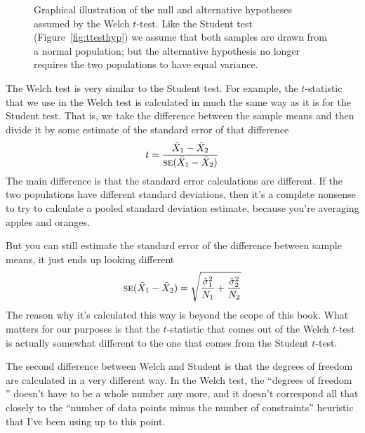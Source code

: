 \begin{figure}
\begin{center}
\caption{Graphical illustration of the null and alternative hypotheses assumed by the Welch $t$-test. Like the Student test (Figure~\ref{fig:ttesthyp}) we assume that both samples are drawn from a normal population; but the alternative hypothesis no longer requires the two populations to have equal variance.}
\HR
\label{fig:ttesthyp2}
\end{center}
\end{figure}

The Welch test is very similar to the Student test. For example, the $t$-statistic that we use in the Welch test is calculated in much the same way as it is for the Student test. That is, we take the difference between the sample means and then divide it by some estimate of the standard error of that difference
$$
t = \frac{\bar{X}_1 - \bar{X}_2}{\mbox{\textsc{se}}(\bar{X}_1 - \bar{X}_2)}
$$
The main difference is that the standard error calculations are different. If the two populations have different standard deviations, then it's a complete nonsense to try to calculate a pooled standard deviation estimate, because you're averaging apples and oranges. 

\vspace{0.5cm}
\begin{mdframed}[style=MyFrame,nobreak=true]
But you can still estimate the standard error of the difference between sample means, it just ends up looking different
$$
\mbox{\textsc{se}}(\bar{X}_1 - \bar{X}_2) = \sqrt{ \frac{{\hat{\sigma}_1}^2}{N_1} + \frac{{\hat{\sigma}_2}^2}{N_2} }
$$
The reason why it's calculated this way is beyond the scope of this book. What matters for our purposes is that the $t$-statistic that comes out of the Welch $t$-test is actually somewhat different to the one that comes from the Student $t$-test. 
\end{mdframed}

The second difference between Welch and Student is that the degrees of freedom are calculated in a very different way. In the Welch test, the ``degrees of freedom '' doesn't have to be a whole number any more, and it doesn't correspond all that closely to the ``number of data points minus the number of constraints'' heuristic that I've been using up to this point. 

